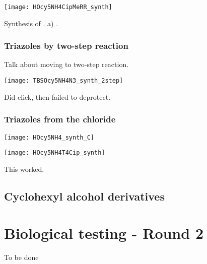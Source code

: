 
\begin{scheme}[H]
	\begin{center}
		\texttt{[image: HOcy5NH4CipMeRR\_synth]}
		\caption{Synthesis of . 
			a) . 
			\label{sch:HOcy5NH4CipMeRR_synth}}
	\end{center}
\end{scheme}

\subsubsection{Triazoles by two-step reaction}
Talk about moving to two-step reaction.

\begin{scheme}[H]
	\begin{center}
		\texttt{[image: TBSOcy5NH4N3\_synth\_2step]}
		\caption{\label{sch:}}
	\end{center}
\end{scheme}

Did click, then failed to deprotect.

\subsubsection{Triazoles from the chloride}

\begin{scheme}[H]
	\begin{center}
		\texttt{[image: HOcy5NH4\_synth\_C]}
		\caption{\label{sch:}}
	\end{center}
\end{scheme}

\begin{scheme}[H]
	\begin{center}
		\texttt{[image: HOcy5NH4T4Cip\_synth]}
		\caption{\label{sch:}}
	\end{center}
\end{scheme}

This worked.

\subsection{Cyclohexyl alcohol derivatives}

\section{Biological testing - Round 2}

To be done
